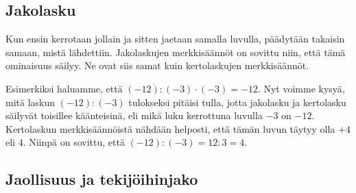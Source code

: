 \subsection*{Jakolasku}

Kun ensin kerrotaan jollain ja sitten jaetaan samalla luvulla, päädytään takaisin samaan,
mistä lähdettiin.  Jakolaskujen merkkisäännöt on sovittu niin, että tämä ominaisuus säilyy.
Ne ovat siis samat kuin kertolaskujen merkkisäännöt.

Esimerkiksi haluamme, että $(-12):(-3)\cdot (-3)=-12$. Nyt voimme kysyä, mitä laskun
$(-12):(-3)$ tulokseksi pitäisi tulla, jotta jakolasku ja kertolasku säilyvät toisillee
käänteisinä, eli mikä luku kerrottuna luvulla $-3$ on $-12$. Kertolaskun merkkisäännöistä
nähdään helposti, että tämän luvun täytyy olla $+4$ eli $4$. Niinpä on
sovittu, että $(-12):(-3)=12:3=4$.


\subsection*{Jaollisuus ja tekijöihinjako}

    
\begin{esimerkki}
	\begin{alakohdat}
	\end{alakohdat}
\end{esimerkki}
   

